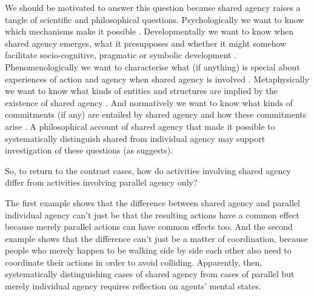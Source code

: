 \documentclass[12pt,\papersize]{extarticle}
\begin{document}
We should be motivated to answer this question because 
shared agency raises a tangle of scientific and philosophical questions.  Psychologically we want to know which mechanisms make it possible \citep{Sebanz:2006yq,vesper_minimal_2010}.  
Developmentally we want to know when shared agency emerges, what it presupposes and whether it might somehow facilitate socio-cognitive, pragmatic or symbolic development \citep{Moll:2007gu,Hughes:2004zj,Brownell:2006gu}.  
Phenomenologically we want to characterise what (if anything) is special about experiences of action and agency when shared agency is involved \citep{Pacherie:2010fk}.  
Metaphysically we want to know what kinds of entities and structures are implied by the existence of shared agency \citep{Gilbert:1992rs,Searle:1994lb}.  
And normatively we want to know what kinds of commitments (if any) are entailed by shared agency and how these commitments arise \citep{Roth:2004ki}.
A philosophical account of shared agency 
that made it possible to systematically distinguish shared from individual agency  
may support investigation of these questions (as \citealp{Bratman:2009lv} suggests).  

So, to return to the contrast cases,
how do activities involving shared agency differ from activities involving parallel agency only? 

The first example shows that the difference between shared agency and parallel individual agency can’t just be that the resulting actions have a common effect because merely parallel actions can have common effects too. 
And the second example shows that the difference can’t just be a matter of coordination, because people who merely happen to be walking side by side each other also need to coordinate their actions in order to avoid colliding.  
Apparently, then, systematically distinguishing cases of shared agency from cases of parallel but merely individual agency  requires reflection on agents' mental states.


%
\end{document}
